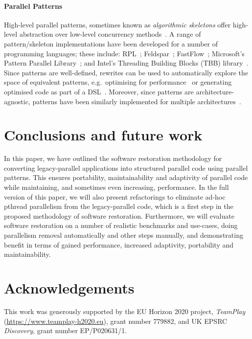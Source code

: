\paragraph{Parallel Patterns}
High-level parallel patterns, sometimes known as \emph{algorithmic skeletons} offer high-level abstraction over low-level concurrency methods~\cite{Asanovic:2009:VPC,DBLP:journals/spe/Gonzalez-VelezL10}.
A range of pattern/skeleton implementations have been developed for a number of programming languages; these include: RPL~\cite{DBLP:conf/pdp/JanjicBMHDAG16}; Feldspar~\cite{DBLP:conf/ifl/AxelssonCSSEP10}; FastFlow~\cite{DBLP:journals/mis/JinLWY15}; Microsoft's Pattern Parallel Library~\cite{ACM:book/msoft/CampbellM11}; and Intel's Threading Building Blocks (TBB) library~\cite{DBLP:reference/parallel/X11pz}.
Since patterns are well-defined, rewrites can be used to automatically explore the space of equivalent patterns, e.g.\ optimising for performance~\cite{DBLP:conf/europar/MatsuzakiKIHA04,DBLP:conf/ipps/GorlatchWL99} or generating optimised code as part of a DSL~\cite{DBLP:conf/dagstuhl/Gorlatch03}. Moreover, since patterns are architecture-agnostic, patterns have been similarly implemented for multiple architectures~\cite{DBLP:conf/cgo/HagedornSSGD18,DBLP:conf/parco/ReyesL15}.

\section{Conclusions and future work} \label{sec:Conclusions} 
In this paper, we have outlined the software restoration methodology for converting legacy-parallel applications into structured parallel code using parallel patterns. This ensures portability, maintainability and adaptivity of parallel code while maintaining, and sometimes even increasing, performance. In the full version of this paper, we will also present refactorings to eliminate ad-hoc pthread parallelism from the legacy-parallel code, which is a first step in the proposed methodology of software restoration. Furthermore, we will evaluate software restoration on a number of realistic benchmarks and use-cases, doing parallelism removal automatically and other steps manually, and demonstrating benefit in terms of gained performance, increased adaptivity, portability and maintainability.

\appendix



\section*{Acknowledgements}
This work was generously supported by the EU Horizon 2020 project, \emph{TeamPlay} (\url{https://www.teamplay-h2020.eu}), grant number 779882, and UK EPSRC \emph{Discovery}, grant number EP/P020631/1.


